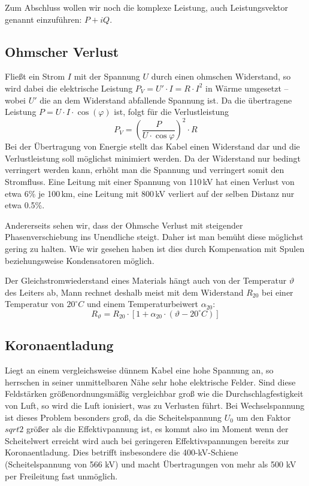 Zum Abschluss wollen wir noch die komplexe Leistung, auch Leistungsvektor genannt einzuführen: $P+i Q$.

\subsection{Ohmscher Verlust}
Fließt ein Strom $I$ mit der Spannung $U$ durch einen ohmschen Widerstand, so wird dabei die elektrische Leistung
$P_V = U' \cdot I = R \cdot I^2$
in Wärme umgesetzt -- wobei $U'$ die an dem Widerstand abfallende Spannung ist.
Da die übertragene Leistung $P=U \cdot I \cdot \cos(\varphi)$ ist, folgt für die Verlustleistung
\[P_V = \left(\frac{P}{U \cdot \cos\varphi}\right)^2\cdot R\]
Bei der Übertragung von Energie stellt das Kabel einen Widerstand dar und die Verlustleistung soll möglichst minimiert werden. Da der Widerstand nur bedingt verringert werden kann, erhöht man die Spannung und verringert somit den Stromfluss. Eine Leitung mit einer Spannung von 110\,kV hat einen Verlust von etwa 6\% je 100\,km, eine Leitung mit 800\,kV verliert auf der selben Distanz nur etwa 0.5\%.

Andererseits sehen wir, dass der Ohmsche Verlust mit steigender Phasenverschiebung ins Unendliche steigt. Daher ist man bemüht diese möglichst gering zu halten. Wie wir gesehen haben ist dies durch Kompensation mit Spulen beziehungsweise Kondensatoren möglich.

Der Gleichstromwiederstand eines Materials hängt auch von der Temperatur $\vartheta$ des Leiters ab, Mann rechnet deshalb meist mit dem Widerstand $R_{20}$ bei einer Temperatur von $20^\circ C$ und einem Temperaturbeiwert $\alpha_{20}$:
\begin{equation}
R_\vartheta = R_{20} \cdot \left[ 1 + \alpha_{20} \cdot \left( \vartheta - 20^\circ C \right) \right]
\end{equation}



\subsection{Koronaentladung}
Liegt an einem vergleichsweise dünnem Kabel eine hohe Spannung an, so herrschen in seiner unmittelbaren Nähe sehr hohe elektrische Felder. Sind diese Feldstärken größenordnungsmäßig vergleichbar groß wie die Durchschlagfestigkeit von Luft, so wird die Luft ionisiert, was zu Verlusten führt. Bei Wechselspannung ist dieses Problem besonders groß, da die Scheitelspannung $U_0$ um den Faktor $sqrt{2}$ größer als die Effektivpannung ist, es kommt also im Moment wenn der Scheitelwert erreicht wird auch bei geringeren Effektivspannungen bereits zur Koronaentladung. Dies betrifft insbesondere die 400-kV-Schiene (Scheitelspannung von 566 kV) und macht Übertragungen von mehr als 500 kV per Freileitung fast unmöglich.
